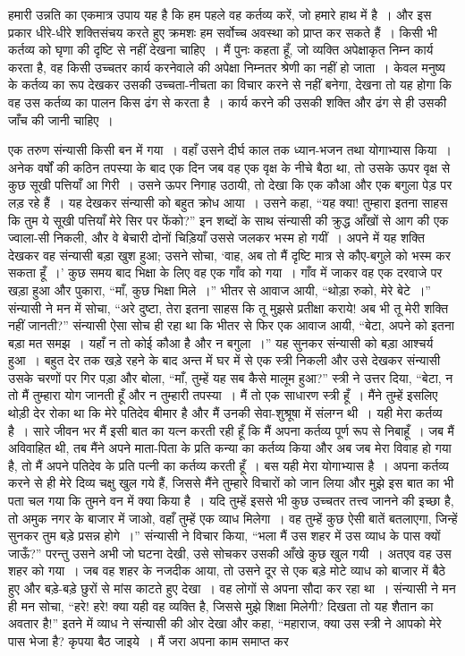 हमारी उन्नति का एकमात्र उपाय यह है कि हम पहले वह कर्तव्य करें, जो हमारे हाथ में है~। और इस प्रकार धीरे-धीरे शक्तिसंचय करते हुए क्रमशः हम सर्वोच्च अवस्था को प्राप्त कर सकते हैं~। किसी भी कर्तव्य को घृणा की दृष्टि से नहीं देखना चाहिए~। मैं पुनः कहता हूँ, जो व्यक्ति अपेक्षाकृत निम्न कार्य करता है, वह किसी उच्चतर कार्य करनेवाले की अपेक्षा निम्नतर श्रेणी का नहीं हो जाता~। केवल मनुष्य के कर्तव्य का रूप देखकर उसकी उच्चता-नीचता का विचार करने से नहीं बनेगा, देखना तो यह होगा कि वह उस कर्तव्य का पालन किस ढंग से करता है~। कार्य करने की उसकी शक्ति और ढंग से ही उसकी जाँच की जानी चाहिए~।

एक तरुण संन्यासी किसी बन में गया~। वहाँ उसने दीर्घ काल तक ध्यान-भजन तथा योगाभ्यास किया~। अनेक वर्षों की कठिन तपस्या के बाद एक दिन जब वह एक वृक्ष के नीचे बैठा था, तो उसके ऊपर वृक्ष से कुछ सूखी पत्तियाँ आ गिरी~। उसने ऊपर निगाह उठायी, तो देखा कि एक कौआ और एक बगुला पेड़ पर लड़ रहे हैं~। यह देखकर संन्यासी को बहुत क्रोध आया~। उसने कहा, “यह क्या! तुम्हारा इतना साहस कि तुम ये सूखी पत्तियाँ मेरे सिर पर फेंको?” इन शब्दों के साथ संन्यासी की क्रुद्ध आँखों से आग की एक ज्वाला-सी निकली, और वे बेचारी दोनों चिड़ियाँ उससे जलकर भस्म हो गयीं~। अपने में यह शक्ति देखकर वह संन्यासी बड़ा खुश हुआ; उसने सोचा, ‘वाह, अब तो मैं दृष्टि मात्र से कौए-बगुले को भस्म कर सकता हूँ~।’ कुछ समय बाद भिक्षा के लिए वह एक गाँव को गया~। गाँव में जाकर वह एक दरवाजे पर खड़ा हुआ और पुकारा, “माँ, कुछ भिक्षा मिले~।” भीतर से आवाज आयी, “थोड़ा रुको, मेरे बेटे~।” संन्यासी ने मन में सोचा, “अरे दुष्टा, तेरा इतना साहस कि तू मुझसे प्रतीक्षा कराये! अब भी तू मेरी शक्ति नहीं जानती?” संन्यासी ऐसा सोच ही रहा था कि भीतर से फिर एक आवाज आयी, “बेटा, अपने को इतना बड़ा मत समझ~। यहाँ न तो कोई कौआ है और न बगुला~।” यह सुनकर संन्यासी को बड़ा आश्चर्य हुआ~। बहुत देर तक खड़े रहने के बाद अन्त में घर में से एक स्त्री निकली और उसे देखकर संन्यासी उसके चरणों पर गिर पड़ा और बोला, “माँ, तुम्हें यह सब कैसे मालूम हुआ?” स्त्री ने उत्तर दिया, “बेटा, न तो मैं तुम्हारा योग जानती हूँ और न तुम्हारी तपस्या~। मैं तो एक साधारण स्त्री हूँ~। मैंने तुम्हें इसलिए थोड़ी देर रोका था कि मेरे पतिदेव बीमार है और मैं उनकी सेवा-शुश्रूषा में संलग्न थी~। यही मेरा कर्तव्य है~। सारे जीवन भर मैं इसी बात का यत्न करती रही हूँ कि मैं अपना कर्तव्य पूर्ण रूप से निबाहूँ~। जब मैं अविवाहित थी, तब मैंने अपने माता-पिता के प्रति कन्या का कर्तव्य किया और अब जब मेरा विवाह हो गया है, तो मैं अपने पतिदेव के प्रति पत्नी का कर्तव्य करती हूँ~। बस यही मेरा योगाभ्यास है~। अपना कर्तव्य करने से ही मेरे दिव्य चक्षु खुल गये हैं, जिससे मैंने तुम्हारे विचारों को जान लिया और मुझे इस बात का भी पता चल गया कि तुमने वन में क्या किया है~। यदि तुम्हें इससे भी कुछ उच्चतर तत्त्व जानने की इच्छा है, तो अमुक नगर के बाजार में जाओ, वहाँ तुम्हें एक व्याध मिलेगा~। वह तुम्हें कुछ ऐसी बातें बतलाएगा, जिन्हें सुनकर तुम बड़े प्रसन्न होगे~।” संन्यासी ने विचार किया, “भला मैं उस शहर में उस व्याध के पास क्यों जाऊँ?” परन्तु उसने अभी जो घटना देखी, उसे सोचकर उसकी आँखे कुछ खुल गयी~। अतएव वह उस शहर को गया~। जब वह शहर के नजदीक आया, तो उसने दूर से एक बड़े मोटे व्याध को बाजार में बैठे हुए और बड़े-बड़े छुरों से मांस काटते हुए देखा~। वह लोगों से अपना सौदा कर रहा था~। संन्यासी ने मन ही मन सोचा, “हरे! हरे! क्या यही वह व्यक्ति है, जिससे मुझे शिक्षा मिलेगी? दिखता तो यह शैतान का अवतार है!” इतने में व्याध ने संन्यासी की ओर देखा और कहा, “महाराज, क्या उस स्त्री ने आपको मेरे पास भेजा है? कृपया बैठ जाइये~। मैं जरा अपना काम समाप्त कर 